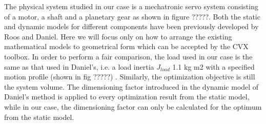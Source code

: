 The physical system studied in our case is a mechatronic servo system consisting of a motor, a shaft and a planetary gear as shown in figure ?????. Both the static and dynamic models for different components have been previously developed by Roos and Daniel. Here we will focus only on how to arrange the existing mathematical models to geometrical form which can be accepted by the CVX toolbox. In order to perform a fair comparison, the load used in our case is the same as that used in Daniel’s, i.e. a load inertia $J_{load}$ 1.1 kg m2 with a specified motion profile (shown in fig ?????) . Similarly, the optimization objective is still the system volume. The dimensioning factor introduced in the dynamic model of Daniel’s method is applied to every optimization result from the static model, while in our case, the dimensioning factor can only be calculated for the optimum from the static model.


